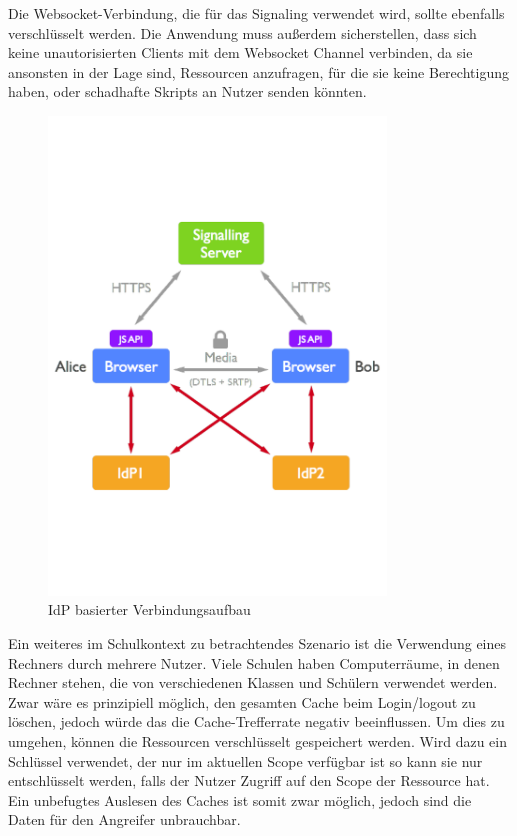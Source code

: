 Die Websocket-Verbindung, die für das Signaling verwendet wird, sollte ebenfalls verschlüsselt werden. Die Anwendung muss außerdem sicherstellen, dass sich keine unautorisierten Clients mit dem Websocket Channel verbinden, da sie ansonsten in der Lage sind, Ressourcen anzufragen, für die sie keine Berechtigung haben, oder schadhafte Skripts an Nutzer senden könnten.

\begin{figure}[!h]
	\centering
	\includegraphics[width=0.8\textwidth]{figures/user_auth}
	\caption[A Figure Short-Title]{IdP basierter Verbindungsaufbau\cite{rtcweb-security}}
	\label{fig:user_auth}
\end{figure}

Ein weiteres im Schulkontext zu betrachtendes Szenario ist die Verwendung eines Rechners durch mehrere Nutzer. Viele Schulen haben Computerräume, in denen Rechner stehen, die von verschiedenen Klassen und Schülern verwendet werden. Zwar wäre es prinzipiell möglich, den gesamten Cache beim Login/logout zu löschen, jedoch würde das die Cache-Trefferrate negativ beeinflussen. Um dies zu umgehen, können die Ressourcen verschlüsselt gespeichert werden. Wird dazu ein Schlüssel verwendet, der nur im aktuellen Scope verfügbar ist so kann sie nur entschlüsselt werden, falls der Nutzer Zugriff auf den Scope der Ressource hat. Ein unbefugtes Auslesen des Caches ist somit zwar möglich, jedoch sind die Daten für den Angreifer unbrauchbar.

